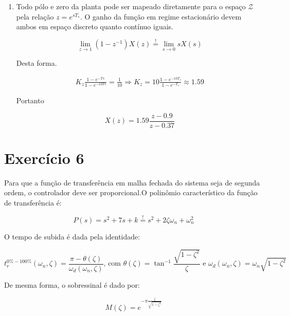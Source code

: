\documentclass{article}
\begin{document}
\begin{enumerate}
\item %
Todo pólo e zero da planta pode ser mapeado diretamente para o espaço $\mathcal{Z}$ pela relação $z = e^{s T_s}$. O ganho da função em regime estacionário devem ambos em espaço discreto quanto contínuo iguais.

\begin{equation}
\lim\limits_{z \rightarrow 1} (1 - z^{-1})X(z) \stackrel{!}{=} \lim\limits_{s \rightarrow 0} s X(s) 
\end{equation} 

Desta forma.

\begin{equation*}
\begin{split}
K_z \frac{1 - e^{-Ts}}{1 - e^{-10Ts}} = \frac{1}{10} \Rightarrow K_z = 10 \frac{1 - e^{-10T_s}}{1 - e^{-T_s}} \approx 1.59
\end{split}
\end{equation*}

Portanto

\begin{equation}
X(z) = 1.59 \frac{z - 0.9}{z - 0.37}
\end{equation}

\end{enumerate}

\section*{Exercício 6}
Para que a função de transferência em malha fechada do sistema seja de segunda ordem, o controlador deve ser proporcional.O polinômio característico da função de transferência é:

\begin{equation}
P(s) = s^2 + 7s + k \stackrel{!}{=} s^2 + 2 \zeta \omega_n + \omega_n^2
\end{equation}

O tempo de subida é dada pela identidade:

\begin{equation}
\label{eq:sobressinal}
t^{0\% - 100\%}_{r}(\omega_n, \zeta) = \frac{\pi - \theta(\zeta)}{\omega_d(\omega_n, \zeta)} \mbox{, com } \theta(\zeta) = \tan^{-1}\frac{\sqrt{1 - \zeta^2}}{\zeta} \mbox{ e } \omega_d(\omega_n, \zeta) = \omega_n \sqrt{1-\zeta^2}
\end{equation}

De mesma forma, o sobressinal é dado por:

\begin{equation}
\label{eq:sobressinal}
M(\zeta) = e^{-\pi \frac{\zeta}{\sqrt{1-\zeta^2}}}
\end{equation}
\end{document}

